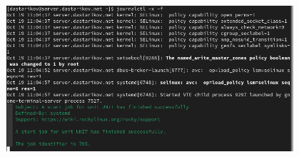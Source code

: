 \begin{enumerate}
\begin{center}
    \centering
    \includegraphics[width=0.8\textwidth]{../images/image13.png}
    \label{13}
\end{center}

\end{enumerate}


